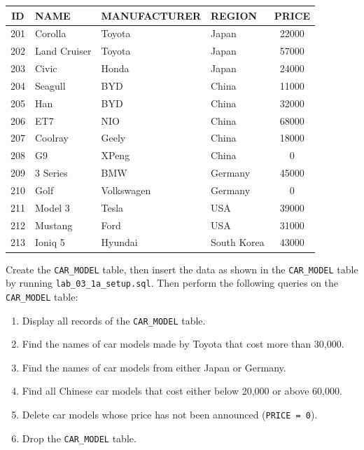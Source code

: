 \documentclass[12pt,a4paper]{article}
\begin{document}
    \begin{table}[h!]\centering
    \begin{tabular}{|c|l|l|l|c|}
        \hline
        \textbf{ID} & \textbf{NAME} & \textbf{MANUFACTURER} & \textbf{REGION} & \textbf{PRICE} \\ \hline
        201 & Corolla & Toyota & Japan & 22000 \\
        202 & Land Cruiser & Toyota & Japan & 57000 \\
        203 & Civic & Honda & Japan & 24000 \\
        204 & Seagull & BYD & China & 11000 \\
        205 & Han & BYD & China & 32000 \\
        206 & ET7 & NIO & China & 68000 \\
        207 & Coolray & Geely & China & 18000 \\
        208 & G9 & XPeng & China & 0 \\
        209 & 3 Series & BMW & Germany & 45000 \\
        210 & Golf & Volkswagen & Germany & 0 \\
        211 & Model 3 & Tesla & USA & 39000 \\
        212 & Mustang & Ford & USA & 31000 \\
        213 & Ioniq 5 & Hyundai & South Korea & 43000 \\ \hline
    \end{tabular}
    \end{table}

\noindent Create the \texttt{CAR\_MODEL} table, then insert the data as shown in the \texttt{CAR\_MODEL} table by running \texttt{lab\_03\_1a\_setup.sql}. Then perform the following queries on the \texttt{CAR\_MODEL} table:
\begin{enumerate}
    \item Display all records of the \texttt{CAR\_MODEL} table.
    \item Find the names of car models made by Toyota that cost more than 30,000.
    \item Find the names of car models from either Japan or Germany.
    \item Find all Chinese car models that cost either below 20,000 or above 60,000.
    \item Delete car models whose price has not been announced (\texttt{PRICE = 0}).
    \item Drop the \texttt{CAR\_MODEL} table.

\end{enumerate}
\end{document}
